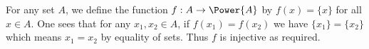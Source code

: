 \begin{questions}
    \item For any set $A$, we define the function $f: A \to \Power{A}$ by $f(x) = \{x\}$ for all $x \in A$. One sees that for any $x_1, x_2 \in A$, if $f(x_1) = f(x_2)$ we have $\{x_1\} = \{x_2\}$ which means $x_1 = x_2$ by equality of sets. Thus $f$ is injective as required.
\end{questions}
